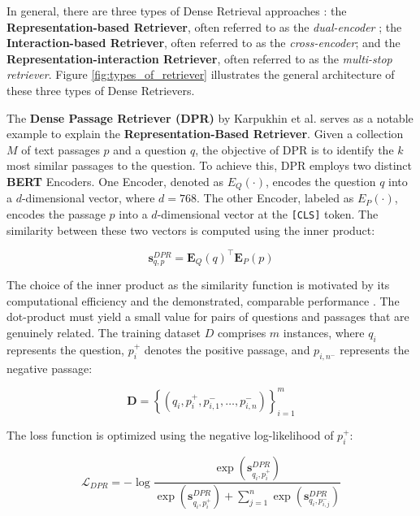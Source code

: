 In general, there are three types of Dense Retrieval approaches \cite{zhu_retrieving_2021}: the \textbf{Representation-based Retriever}, often referred to as the \textit{dual-encoder} \cite{karpukhin_dense_2020}; the \textbf{Interaction-based Retriever}, often referred to as the \textit{cross-encoder}; and the \textbf{Representation-interaction Retriever}, often referred to as the \textit{multi-stop retriever}. Figure \ref{fig:types_of_retriever} illustrates the general architecture of these three types of Dense Retrievers.

The \textbf{Dense Passage Retriever (DPR)} by Karpukhin et al. serves as a notable example to explain the \textbf{Representation-Based Retriever}. Given a collection $M$ of text passages $p$ and a question $q$, the objective of DPR is to identify the $k$ most similar passages to the question. To achieve this, DPR employs two distinct \textbf{BERT} \cite{devlin_bert_2019} Encoders. One Encoder, denoted as $E_Q(\cdot)$, encodes the question $q$ into a $d$-dimensional vector, where $d = 768$. The other Encoder, labeled as $E_P(\cdot)$, encodes the passage $p$ into a $d$-dimensional vector at the \verb|[CLS]| token. The similarity between these two vectors is computed using the inner product:


\begin{equation}
    \mathbf{s}_{q, p}^{D P R}=\mathbf{E}_{Q}(q)^{\top} \mathbf{E}_{P}(p)
    \label{eq:dpr}
\end{equation}

The choice of the inner product as the similarity function is motivated by its computational efficiency and the demonstrated, comparable performance \cite{karpukhin_dense_2020}. The dot-product must yield a small value for pairs of questions and passages that are genuinely related. The training dataset $D$ comprises $m$ instances, where $q_i$ represents the question, $p_i^+$ denotes the positive passage, and $p_{i,n^-}$ represents the negative passage:

\begin{equation}
    \mathbf{D}=\left\{\left(q_{i}, p_{i}^{+}, p_{i, 1}^{-}, \ldots, p_{i, n}^{-}\right)\right\}_{i=1}^{m}
\end{equation}

The loss function is optimized using the negative log-likelihood of $p_i^+$:

\begin{equation}
    \mathcal{L}_{D P R}=-\log \frac{\exp \left(\mathbf{s}_{q_i,p_i^{+}}^{D P R}\right)}{\exp \left(\mathbf{s}_{q_i,p_i^{+}}^{D P R}\right) + \sum_{j=1}^{n} \exp \left(\mathbf{s}_{q_i,p_{i,j}^{-}}^{D P R}\right)}
\end{equation}

